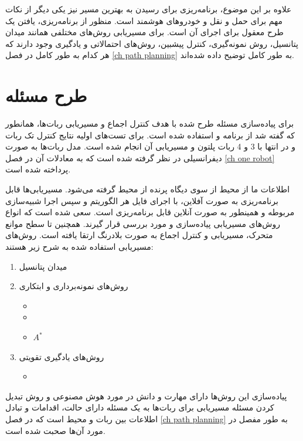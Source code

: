 علاوه بر این موضوع، برنامه‌ریزی برای رسیدن به بهترین مسیر نیز یکی دیگر از نکات مهم برای حمل و نقل و خودروهای هوشمند است. منظور از برنامه‌ریزی، یافتن یک طرح معقول برای اجرای آن است. برای مسیریابی روش‌های مختلفی همانند میدان پتانسیل، روش نمونه‌گیری، کنترل پیشبین، روش‌های احتمالاتی\cite{lefkopoulos2019using} و یادگیری وجود دارند که هر کدام به طور کامل در فصل \ref{ch path planning} به طور کامل توضیح داده شده‌اند.

\section{طرح مسئله}
برای پیاده‌سازی مسئله طرح شده با هدف کنترل اجماع و مسیریابی ربات‌ها، همانطور که گفته شد از برنامه  و  استفاده شده است. برای تست‌های اولیه نتایج کنترل تک ربات و در انتها با 3 و 4 ربات پلتون و مسیریابی آن انجام شده است. مدل ربات‌ها به صورت دیفرانسیلی در نظر گرفته شده است که به معادلات آن در فصل \ref{ch one robot} پرداخته شده است.

اطلاعات ما از محیط از سوی دیگاه پرنده از محیط گرفته می‌شود. مسیریابی‌ها قابل برنامه‌ریزی به صورت آفلاین، با اجرای فایل  هر الگوریتم و سپس اجرا شبیه‌سازی مربوطه و همینطور به صورت آنلاین قابل برنامه‌ریزی است. سعی شده است که انواع روش‌های مسیریابی پیاده‌سازی و مورد بررسی قرار گیرند. همچنین تا سطح موانع متحرک، مسیریابی و کنترل اجماع به صورت بلادرنگ ارتقا یافته است.
روش‌های مسیریابی استفاده شده به شرح زیر هستند:
\begin{enumerate}
	\item میدان پتانسیل
	\item روش‌های نمونه‌برداری و ابتکاری
	\begin{itemize}
		\item {}
		\item {}
		\item $A^*$
	\end{itemize}
	\item روش‌های یادگیری تقویتی
	\begin{itemize}
		\item {}
	\end{itemize}
\end{enumerate}

پیاده‌سازی این روش‌ها دارای مهارت و دانش در مورد هوش مصنوعی و روش تبدیل کردن مسئله مسیریابی برای ربات‌ها به یک مسئله دارای حالت، اقدامات و تبادل اطلاعات بین ربات‌ و محیط است که در فصل \ref{ch path planning} به طور مفصل در مورد آن‌ها صحبت شده است.

